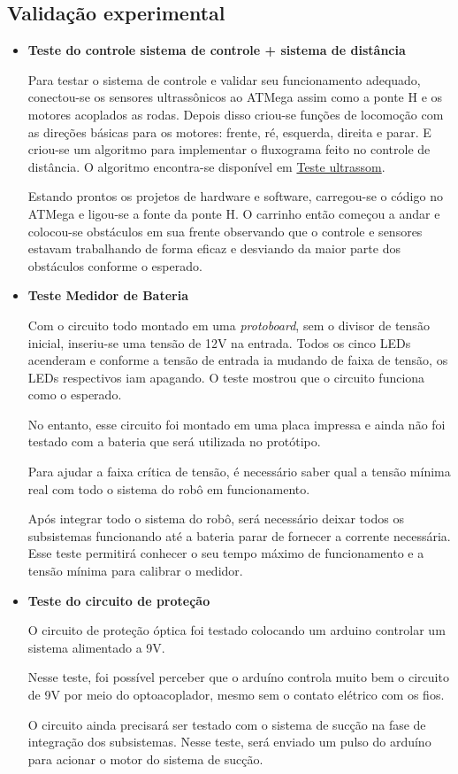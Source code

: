 \subsection{Validação experimental} %
	\label{sub:validação_experimental}
	\begin{itemize}
		\item \textbf{Teste do controle sistema de controle + sistema de distância}

			Para testar o sistema de controle e validar seu funcionamento adequado, conectou-se os sensores ultrassônicos ao ATMega assim como a ponte H e os motores acoplados as rodas. Depois disso criou-se funções de locomoção com as direções básicas para os motores: frente, ré, esquerda, direita e parar. E criou-se um algoritmo para implementar o fluxograma feito no controle de distância. O algoritmo encontra-se disponível em \href{https://github.com/kaiocoelho/CodigoESP/blob/master/codigo_teste/Teste_ultrassom.ino}{Teste ultrassom}.

			Estando prontos os projetos de hardware e software, carregou-se o código no ATMega e ligou-se a fonte da ponte H. O carrinho então começou a andar e colocou-se obstáculos em sua frente observando que o controle e sensores estavam trabalhando de forma eficaz e desviando da maior parte dos obstáculos conforme o esperado.

		\item \textbf{Teste Medidor de Bateria}

			Com o circuito todo montado em uma \textit{protoboard}, sem o divisor de tensão inicial, inseriu-se uma tensão de 12V na entrada. Todos os cinco LEDs acenderam e conforme a tensão de entrada ia mudando de faixa de tensão, os LEDs respectivos iam apagando. O teste mostrou que o circuito funciona como o esperado.

			No entanto, esse circuito foi montado em uma placa impressa e ainda não foi testado com a bateria que será utilizada no protótipo.

			Para ajudar a faixa crítica de tensão, é necessário saber qual a tensão mínima real com todo o sistema do robô em funcionamento.

			Após integrar todo o sistema do robô, será necessário deixar todos os subsistemas funcionando até a bateria parar de fornecer a corrente necessária. Esse teste permitirá conhecer o seu tempo máximo de funcionamento e a tensão mínima para calibrar o medidor.

		\item \textbf{Teste do circuito de proteção}
		
			O circuito de proteção óptica foi testado colocando um arduino controlar um sistema alimentado a 9V.

			Nesse teste, foi possível perceber que o arduíno controla muito bem o circuito de 9V por meio do optoacoplador, mesmo sem o contato elétrico com os fios.

			O circuito ainda precisará ser testado com o sistema de sucção na fase de integração dos subsistemas. Nesse teste, será enviado um pulso do arduíno para acionar o motor do sistema de sucção.
	\end{itemize}

